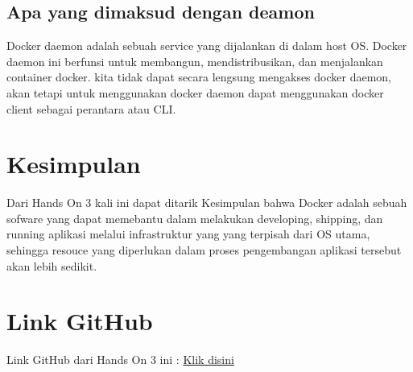 \documentclass[11pt,a4paper]{article}
\begin{document}
\subsection{Apa yang dimaksud dengan deamon}
Docker daemon adalah sebuah service yang dijalankan di dalam host OS. Docker daemon ini
berfunsi untuk membangun, mendistribusikan, dan menjalankan container docker.
kita tidak dapat secara lengsung mengakses docker daemon, akan tetapi untuk menggunakan docker
daemon dapat menggunakan docker client sebagai perantara atau CLI. \cite{contributor_2005}


\section{Kesimpulan}
Dari Hands On 3 kali ini dapat ditarik Kesimpulan bahwa Docker adalah sebuah sofware yang 
dapat memebantu dalam melakukan developing, shipping, dan running aplikasi melalui
infrastruktur yang yang terpisah dari OS utama, sehingga resouce yang diperlukan 
dalam proses pengembangan aplikasi tersebut akan lebih sedikit.

\section{Link GitHub}
	Link GitHub dari Hands On 3 ini : \href{https://github.com/JhonPudan35/HandsOn-3}{Klik disini}

\newpage


\end{document}
